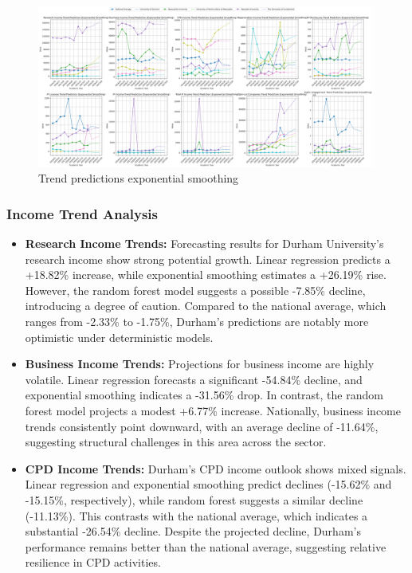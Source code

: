 \documentclass[journal,onecolumn, 10pt,draftclsnofoot]{IEEEtran}
\begin{document}
\begin{figure}[h]
\centering
\includegraphics[width=0.99\textwidth]{Fig/figure43.trend_predictions_exponential_smoothing.png}
\caption{Trend predictions exponential smoothing}
\label{fig:trend-predictions-exponential-smoothing}
\end{figure}

\subsubsection{Income Trend Analysis}

\begin{itemize}
    \item \textbf{Research Income Trends:} Forecasting results for Durham University's research income show strong potential growth. Linear regression predicts a +18.82\% increase, while exponential smoothing estimates a +26.19\% rise. However, the random forest model suggests a possible -7.85\% decline, introducing a degree of caution. Compared to the national average, which ranges from -2.33\% to -1.75\%, Durham's predictions are notably more optimistic under deterministic models.
    
    \item \textbf{Business Income Trends:} Projections for business income are highly volatile. Linear regression forecasts a significant -54.84\% decline, and exponential smoothing indicates a -31.56\% drop. In contrast, the random forest model projects a modest +6.77\% increase. Nationally, business income trends consistently point downward, with an average decline of -11.64\%, suggesting structural challenges in this area across the sector.
    
    \item \textbf{CPD Income Trends:} Durham's CPD income outlook shows mixed signals. Linear regression and exponential smoothing predict declines (-15.62\% and -15.15\%, respectively), while random forest suggests a similar decline (-11.13\%). This contrasts with the national average, which indicates a substantial -26.54\% decline. Despite the projected decline, Durham's performance remains better than the national average, suggesting relative resilience in CPD activities.
\end{itemize}
\end{document}
